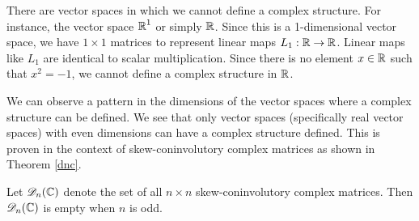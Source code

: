  There are vector spaces in which we cannot define a complex structure. For instance, the vector space $\operatorname{\mathbb{R}}^1$ or simply $\operatorname{\mathbb{R}}$. Since this is a 1-dimensional vector space, we have $1\times 1$ matrices to represent linear maps $L_1: \operatorname{\mathbb{R}} \rightarrow \operatorname{\mathbb{R}}$. Linear maps like $L_1$ are identical to scalar multiplication. Since there is no element $x \in \operatorname{\mathbb{R}}$ such that $x^2 = -1$, we cannot define a complex structure in $\operatorname{\mathbb{R}}$. 

 We can observe a pattern in the dimensions of the vector spaces where a complex structure can be defined. We see that only vector spaces (specifically real vector spaces) with even dimensions can have a complex structure defined. This is proven in the context of skew-coninvolutory complex matrices as shown in Theorem \ref{dnc}.

\begin{theorem} \label{dnc}
	\emph{\cite{stamaria}} Let $\mathscr{D}_{n}(\operatorname{\mathbb{C}})$ denote the set of all $n \times n$ skew-coninvolutory complex matrices. Then $\mathscr{D}_{n}(\operatorname{\mathbb{C}})$ is empty when $n$ is odd.
\end{theorem}

